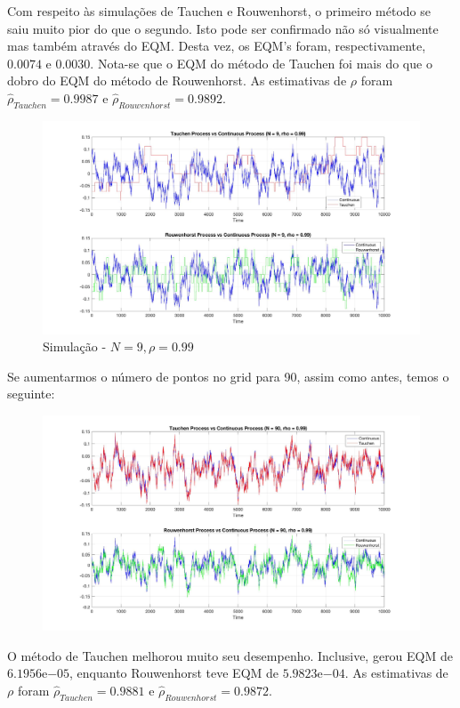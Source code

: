 \documentclass[10pt]{article}
\begin{document}
Com respeito às simulações de Tauchen e Rouwenhorst, o primeiro método se saiu muito pior do que o segundo. Isto pode ser confirmado não só visualmente mas também através do EQM. Desta vez, os EQM's foram, respectivamente, $0.0074$ e $0.0030$. Nota-se que o EQM do método de Tauchen foi mais do que o dobro do EQM do método de Rouwenhorst. As estimativas de $\rho$ foram $\hat{\rho}_{Tauchen} = 0.9987$ e $\hat{\rho}_{Rouwenhorst} = 0.9892$.
\begin{figure}[h!]
	\centering
	\includegraphics[scale = 0.26]{tauchen-vs-rou-n9-99}
	\caption{Simulação - $N = 9, \rho = 0.99$}
\end{figure}

Se aumentarmos o número de pontos no grid para 90, assim como antes, temos o seguinte:
\begin{figure}[h!]
	\centering
	\includegraphics[scale = 0.26]{tauchen-vs-rou-n90-99}
\end{figure}

O método de Tauchen melhorou muito seu desempenho. Inclusive, gerou EQM de $6.1956\mathrm{e}{-05}$, enquanto Rouwenhorst teve EQM de $5.9823\mathrm{e}{-04}$. As estimativas de $\rho$ foram $\hat{\rho}_{Tauchen} =  0.9881$ e $\hat{\rho}_{Rouwenhorst} = 0.9872$.
\end{document}
